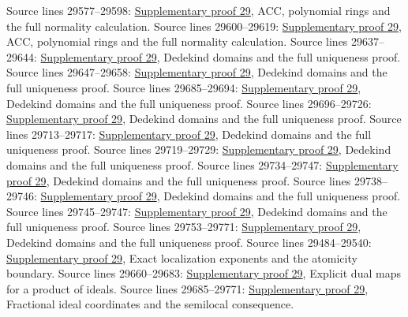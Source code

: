 \begin{AlgebraSourceRoutes}
 Source lines 29577--29598: \hyperlink{algebra_factorization_notes_20260928}{Supplementary proof 29}, ACC, polynomial rings and the full normality calculation.
 Source lines 29600--29619: \hyperlink{algebra_factorization_notes_20260928}{Supplementary proof 29}, ACC, polynomial rings and the full normality calculation.
 Source lines 29637--29644: \hyperlink{algebra_factorization_notes_20260928}{Supplementary proof 29}, Dedekind domains and the full uniqueness proof.
 Source lines 29647--29658: \hyperlink{algebra_factorization_notes_20260928}{Supplementary proof 29}, Dedekind domains and the full uniqueness proof.
 Source lines 29685--29694: \hyperlink{algebra_factorization_notes_20260928}{Supplementary proof 29}, Dedekind domains and the full uniqueness proof.
 Source lines 29696--29726: \hyperlink{algebra_factorization_notes_20260928}{Supplementary proof 29}, Dedekind domains and the full uniqueness proof.
 Source lines 29713--29717: \hyperlink{algebra_factorization_notes_20260928}{Supplementary proof 29}, Dedekind domains and the full uniqueness proof.
 Source lines 29719--29729: \hyperlink{algebra_factorization_notes_20260928}{Supplementary proof 29}, Dedekind domains and the full uniqueness proof.
 Source lines 29734--29747: \hyperlink{algebra_factorization_notes_20260928}{Supplementary proof 29}, Dedekind domains and the full uniqueness proof.
 Source lines 29738--29746: \hyperlink{algebra_factorization_notes_20260928}{Supplementary proof 29}, Dedekind domains and the full uniqueness proof.
 Source lines 29745--29747: \hyperlink{algebra_factorization_notes_20260928}{Supplementary proof 29}, Dedekind domains and the full uniqueness proof.
 Source lines 29753--29771: \hyperlink{algebra_factorization_notes_20260928}{Supplementary proof 29}, Dedekind domains and the full uniqueness proof.
 Source lines 29484--29540: \hyperlink{algebra_factorization_notes_20260928}{Supplementary proof 29}, Exact localization exponents and the atomicity boundary.
 Source lines 29660--29683: \hyperlink{algebra_factorization_notes_20260928}{Supplementary proof 29}, Explicit dual maps for a product of ideals.
 Source lines 29685--29771: \hyperlink{algebra_factorization_notes_20260928}{Supplementary proof 29}, Fractional ideal coordinates and the semilocal consequence.
\end{AlgebraSourceRoutes}

